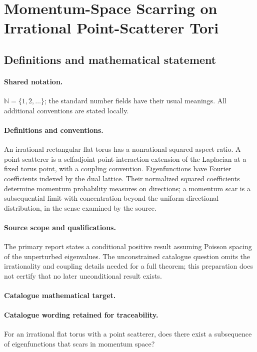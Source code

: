\documentclass[11pt]{article}
\begin{document}
\section{Momentum-Space Scarring on Irrational Point-Scatterer Tori}\label{statement}

\subsection{Definitions and mathematical statement}

\paragraph{Shared notation.}$\mathbb N=\{1,2,\ldots\}$; the standard number fields have their usual meanings. All additional conventions are stated locally.


\paragraph{Definitions and conventions.} An irrational rectangular flat torus has a nonrational squared aspect ratio. A point scatterer is a selfadjoint point-interaction extension of the Laplacian at a fixed torus point, with a coupling convention. Eigenfunctions have Fourier coefficients indexed by the dual lattice. Their normalized squared coefficients determine momentum probability measures on directions; a momentum scar is a subsequential limit with concentration beyond the uniform directional distribution, in the sense examined by the source.

\paragraph{Source scope and qualifications.} The primary report states a conditional positive result assuming Poisson spacing of the unperturbed eigenvalues. The unconstrained catalogue question omits the irrationality and coupling details needed for a full theorem; this preparation does not certify that no later unconditional result exists.

\paragraph{Catalogue mathematical target.}
\paragraph{Catalogue wording retained for traceability.}
For an irrational flat torus with a point scatterer, does there exist a subsequence of eigenfunctions that scars in momentum space?
\end{document}
